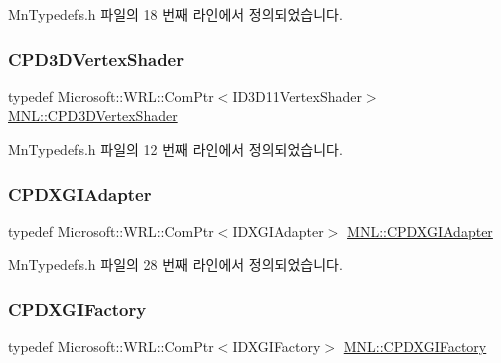 Mn\+Typedefs.\+h 파일의 18 번째 라인에서 정의되었습니다.

\mbox{\label{namespace_m_n_l_a8036d713226061c4827b537821fbf79b}} 
\subsubsection{\texorpdfstring{C\+P\+D3\+D\+Vertex\+Shader}{CPD3DVertexShader}}
{\footnotesize\ttfamily typedef Microsoft\+::\+W\+R\+L\+::\+Com\+Ptr$<$I\+D3\+D11\+Vertex\+Shader$>$ \hyperlink{namespace_m_n_l_a8036d713226061c4827b537821fbf79b}{M\+N\+L\+::\+C\+P\+D3\+D\+Vertex\+Shader}}



Mn\+Typedefs.\+h 파일의 12 번째 라인에서 정의되었습니다.

\mbox{\label{namespace_m_n_l_ab0e24805043a50c45364c389f8929f33}} 
\subsubsection{\texorpdfstring{C\+P\+D\+X\+G\+I\+Adapter}{CPDXGIAdapter}}
{\footnotesize\ttfamily typedef Microsoft\+::\+W\+R\+L\+::\+Com\+Ptr$<$I\+D\+X\+G\+I\+Adapter$>$ \hyperlink{namespace_m_n_l_ab0e24805043a50c45364c389f8929f33}{M\+N\+L\+::\+C\+P\+D\+X\+G\+I\+Adapter}}



Mn\+Typedefs.\+h 파일의 28 번째 라인에서 정의되었습니다.

\mbox{\label{namespace_m_n_l_a8bb070ff80c5e3a874d942fbc31c22ab}} 
\subsubsection{\texorpdfstring{C\+P\+D\+X\+G\+I\+Factory}{CPDXGIFactory}}
{\footnotesize\ttfamily typedef Microsoft\+::\+W\+R\+L\+::\+Com\+Ptr$<$I\+D\+X\+G\+I\+Factory$>$ \hyperlink{namespace_m_n_l_a8bb070ff80c5e3a874d942fbc31c22ab}{M\+N\+L\+::\+C\+P\+D\+X\+G\+I\+Factory}}



